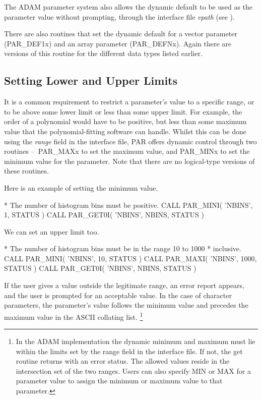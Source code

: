 \documentclass[twoside,11pt,nolof]{starlink}
\providecommand{\dash}{--}
\begin{document}
The {\footnotesize ADAM} parameter system also allows the dynamic
default to be used as the parameter value without prompting, through
the interface file \emph{vpath\/} (see
).


There are also routines that set the dynamic default for a vector
parameter (PAR\_DEF1x) and an array parameter (PAR\_DEFNx).   Again
there are versions of this routine for the different data types listed
earlier.

\subsection{Setting Lower and Upper Limits}

It is a common requirement to restrict a parameter's value to a specific
range, or to be above some lower limit or less than some upper limit.
For example, the order of a polynomial would have to be positive, but
less than some maximum value that the polynomial-fitting software can
handle.  Whilst this can be done using the \emph{range\/} field in the
interface file, PAR offers dynamic control through two
routines \dash\ PAR\_MAXx to set the maximum value, and PAR\_MINx to set the
minimum value for the parameter.  Note that there are no logical-type
versions of these routines.

Here is an example of setting the minimum value.

\begin{terminalv}
*  The number of histogram bins must be positive.
      CALL PAR_MINI( 'NBINS', 1, STATUS )
      CALL PAR_GET0I( 'NBINS', NBINS, STATUS )
\end{terminalv}

We can set an upper limit too.
\begin{terminalv}
*  The number of histogram bins must be in the range 10 to 1000
*  inclusive.
      CALL PAR_MINI( 'NBINS', 10, STATUS )
      CALL PAR_MAXI( 'NBINS', 1000, STATUS )
      CALL PAR_GET0I( 'NBINS', NBINS, STATUS )
\end{terminalv}

If the user gives a value outside the legitimate range, an error report
appears, and the user is prompted for an acceptable value. In the case
of character parameters, the parameter's value follows the minimum value
and precedes the maximum value in the ASCII collating list. \footnote{In
the ADAM implementation the dynamic minimum and maximum must lie within
the limits set by the range field in the interface file.  If not,
the get routine returns with an error status.  The allowed values reside
in the intersection set of the two ranges.  Users can also specify MIN
or MAX for a parameter value to assign the minimum or maximum value to
that parameter.}
\end{document}
